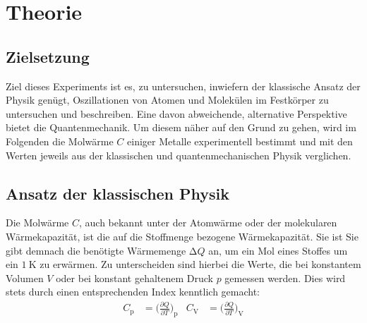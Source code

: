 \section{Theorie}
\label{sec:Theorie}
\subsection{Zielsetzung}
    Ziel dieses Experiments ist es, zu untersuchen, inwiefern der klassische Ansatz der Physik genügt, Oszillationen von 
    Atomen und Molekülen im Festkörper zu untersuchen und beschreiben. 
    Eine davon abweichende, alternative Perspektive bietet die Quantenmechanik. 
    Um diesem näher auf den Grund zu gehen, wird im Folgenden die Molwärme $C$ einiger Metalle experimentell bestimmt und 
    mit den Werten jeweils aus der klassischen und quantenmechanischen Physik verglichen. 
\subsection{Ansatz der klassischen Physik}
    Die Molwärme $C$, auch bekannt unter der Atomwärme oder der molekularen Wärmekapazität, ist die auf die 
    Stoffmenge bezogene Wärmekapazität. 
    Sie ist 
    Sie gibt demnach die benötigte Wärmemenge $\increment Q$ an, um ein Mol eines Stoffes um ein $\SI{1}{\kelvin}$ zu erwärmen.
    Zu unterscheiden sind hierbei die Werte, die bei konstantem Volumen $V$ oder bei konstant gehaltenem Druck $p$ gemessen 
    werden. Dies wird stets durch einen entsprechenden Index kenntlich gemacht: 
    \begin{align*}
        C_{\text{p}} &= \biggl(\frac{\partial Q}{\partial T}\biggr)_{\text{p}} &
        C_{\text{V}} &= \biggl(\frac{\partial Q}{\partial T}\biggr)_{\text{V}} \\
    \end{align*}
